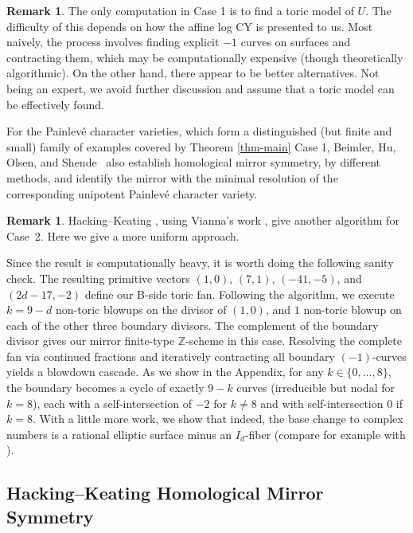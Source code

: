 \documentclass[11pt, reqno]{amsart}
\theoremstyle{definition}
\newtheorem{remark}[theorem]{Remark}
\begin{document}
\begin{remark} The only computation in Case 1 is to find a toric model of $U$. The difficulty of this depends on how the affine log CY is presented to us. Most naively, the process involves finding explicit $-1$ curves on surfaces and contracting them, which may be computationally expensive (though theoretically algorithmic). On the other hand, there appear to be better alternatives. Not being an expert, we avoid further discussion and assume that a toric model can be effectively found.

For the Painlevé character varieties, which form a distinguished (but finite and small) family of examples covered by Theorem \ref{thm-main} Case 1, Beimler, Hu, Olsen, and Shende~\cite{BHOS} also establish homological mirror symmetry, by different methods, and identify the mirror with the minimal resolution of the corresponding unipotent Painlevé character variety.

\end{remark}
    
\begin{remark}    
    Hacking--Keating \cite[Section~6.3]{HK22}, using Vianna's work
\cite{Via17}, give another algorithm for Case~2. Here we give a more
uniform approach.

        Since the result is computationally heavy, it is worth doing the following sanity check. The resulting primitive vectors $(1, 0)$, $(7, 1)$, $(-41, -5)$, and $(2d - 17, -2)$ define our B-side toric fan. Following the algorithm, we execute $k = 9-d$ non-toric blowups on the divisor of $(1,0)$, and $1$ non-toric blowup on each of the other three boundary divisors. The complement of the boundary divisor gives our mirror finite-type $\mathbb{Z}$-scheme in this case. Resolving the complete fan via continued fractions and iteratively contracting all boundary $(-1)$-curves yields a blowdown cascade. As we show in the Appendix, for any $k \in \{0, \dots, 8\}$, the boundary becomes a cycle of exactly $9-k$ curves (irreducible but nodal for $k=8$), each with a self-intersection of $-2$ for $k\neq 8$ and with self-intersection $0$ if $k=8$. With a little more work, we show that indeed, the base change to complex numbers is a rational elliptic surface minus an $I_{d}$-fiber (compare for example with \cite{AKO06}).
\end{remark}

\subsection{Hacking--Keating Homological Mirror Symmetry}
\end{document}

